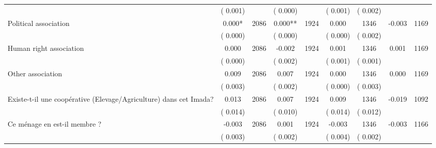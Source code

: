 \begin{tabular}{l*{8}{c}}
                       &       (       0.001)            &                               &       (       0.000)            &                               &       (       0.001)            &       (       0.002) &                  \\
Political association        &              0.000*      &       2086       &              0.000**      &       1924       &              0.000      &       1346  &       -0.003 &       1169       \\
                       &       (       0.000)            &                               &       (       0.000)            &                               &       (       0.000)            &       (       0.002) &                  \\
Human right association        &              0.000      &       2086       &             -0.002      &       1924       &              0.001      &       1346  &        0.001 &       1169       \\
                       &       (       0.000)            &                               &       (       0.002)            &                               &       (       0.001)            &       (       0.001) &                  \\
Other association        &              0.009      &       2086       &              0.007      &       1924       &              0.000      &       1346  &        0.000 &       1169       \\
                       &       (       0.003)            &                               &       (       0.002)            &                               &       (       0.000)            &       (       0.003) &                  \\
Existe-t-il une coopérative (Elevage/Agriculture) dans cet Imada?        &              0.013      &       2086       &              0.007      &       1924       &              0.009      &       1346  &       -0.019 &       1092       \\
                       &       (       0.014)            &                               &       (       0.010)            &                               &       (       0.014)            &       (       0.012) &                  \\
Ce ménage en est-il membre ?        &             -0.003      &       2086       &              0.001      &       1924       &             -0.003      &       1346  &       -0.003 &       1166       \\
                       &       (       0.003)            &                               &       (       0.002)            &                               &       (       0.004)            &       (       0.002) &                  \\
\hline \end{tabular}